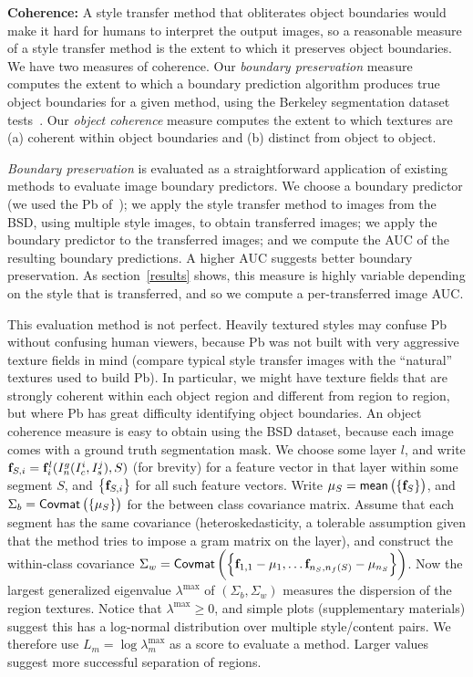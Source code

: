 \documentclass[runningheads]{llncs}
\newcommand{\vect}[1]{{\bf {#1}}}
\begin{document}
{\bf Coherence:} A style transfer method that obliterates object boundaries would make it hard for humans to interpret
the output images, so a reasonable measure of a style transfer method is the extent to which it preserves object
boundaries.  We have two measures of coherence.  Our {\em boundary preservation} measure computes the extent to which a
boundary prediction algorithm produces true object boundaries for a given method, using the Berkeley segmentation
dataset tests~\cite{}.  Our {\em object coherence} measure computes the extent to which textures are (a) coherent within object
boundaries and (b) distinct from object to object.

{\em Boundary preservation} is evaluated as a straightforward application of existing methods to evaluate image boundary 
predictors.  We choose a boundary predictor (we used the Pb of~\cite{}); we apply the style transfer method to images
from the BSD, using multiple style images,  to obtain transferred images; we apply the boundary predictor to the
transferred images; and we compute the AUC of the resulting boundary predictions.  A higher AUC suggests better boundary
preservation.  As section~\ref{results} shows, this measure is highly variable depending on the style that is
transferred, and so we compute a per-transferred image AUC.

This evaluation method is not perfect.  Heavily textured styles may confuse Pb without confusing human viewers, because
Pb was not built with very aggressive texture fields in  mind (compare typical style transfer images with the ``natural''
textures used to build Pb).  In particular, we might have texture fields that are strongly coherent within each object
region and different from region to region, but where Pb has great difficulty identifying object boundaries.  An object
coherence measure is easy to obtain using the BSD dataset, because each image comes with a ground truth segmentation
mask.  We choose some layer $l$, and write $\vect{f}_{S,i}=\vect{f}_{i}^{l}(I^g_n(I_c^i,I_s^j), S)$ (for brevity) for a feature
vector in that layer within some segment $S$, and $\left\{\vect{f}_{S,i}\right\}$ for all such feature
vectors.  Write $\mu_S=\mean{\vect{f}_S}$, and $\Sigma_b={ {\small {\mathsf{Covmat}} \left( \left\{ {{\mu_S}} \right\} \right) }}$ for the between class covariance matrix.
Assume that each segment has the same covariance (heteroskedasticity,
a tolerable assumption given that the method tries to impose a gram matrix on the layer), and construct the within-class
covariance $\Sigma_w=\covmat{\vect{f}_{1,1}-\mu_1, \ldots \vect{f}_{n_S,n_f(S)}-\mu_{n_S}}$.  Now the
largest generalized eigenvalue $\lambda^{\mbox{max}}$ of $(\Sigma_b, \Sigma_w)$ measures the dispersion of the region
textures.   Notice that $\lambda^{\mbox{max}}\geq 0$, and simple plots (supplementary materials) suggest this has a
log-normal distribution over multiple style/content pairs.  We therefore use $L_m=\log \lambda^{\mbox{max}}_{m}$ as a
score to evaluate a method.  Larger values suggest more successful separation of regions.
\end{document}
